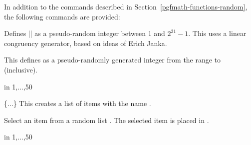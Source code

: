 In addition to the commands described in
Section~\ref{pgfmath-functions-random}, the following commands are provided:

\begin{command}{\pgfmathgeneratepseudorandomnumber}
    Defines |\pgfmathresult| as a pseudo-random integer between 1 and
    $2^{31}-1$. This uses a linear congruency generator, based on ideas of
    Erich Janka.
\end{command}

\begin{command}{\pgfmathrandominteger{}}
    This defines  as a pseudo-randomly generated integer from the
    range  to  (inclusive).
\begin{codeexample}[]
\begin{pgfpicture}
   \foreach \x in {1,...,50}{
      \color{blue!40!white}
   }
\end{pgfpicture}
\end{codeexample}
\end{command}

\begin{command}{\pgfmathdeclarerandomlist{}\{...\}}
    This creates a list of items with the name .
\end{command}

\begin{command}{\pgfmathrandomitem{}}
    Select an item from a random list . The
    selected item is placed in .
\end{command}

\begin{codeexample}[]
\begin{pgfpicture}
   \foreach \a in {1,...,50}{
      \color{\c!40!white}
   }
\end{pgfpicture}
\end{codeexample}

